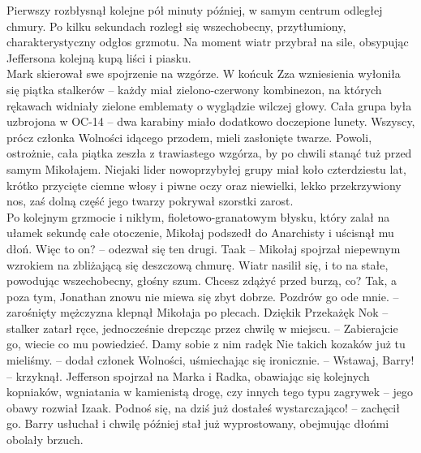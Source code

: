 \documentclass[../MAIN.tex]{subfiles}
\begin{document}
Pierwszy rozbłysnął kolejne pół minuty później, w samym centrum odległej chmury. Po kilku sekundach rozległ się wszechobecny, przytłumiony, charakterystyczny odgłos grzmotu. Na moment wiatr przybrał na sile, obsypując Jeffersona kolejną kupą liści i piasku.\\
Mark skierował swe spojrzenie na wzgórze.
\sx W końcu\3k \qd
Zza wzniesienia wyłoniła się piątka stalkerów -- każdy miał zielono-czerwony kombinezon, na których rękawach widniały zielone emblematy o wyglądzie wilczej głowy. Cała grupa była uzbrojona w OC-14 -- dwa karabiny miało dodatkowo doczepione lunety. Wszyscy, prócz członka Wolności idącego przodem, mieli zasłonięte twarze. Powoli, ostrożnie, cała piątka zeszła z trawiastego wzgórza, by po chwili stanąć tuż przed samym Mikołajem. Niejaki lider nowoprzybyłej grupy miał koło czterdziestu lat, krótko przycięte ciemne włosy i piwne oczy oraz niewielki, lekko przekrzywiony nos, zaś dolną część jego twarzy pokrywał szorstki zarost.\\
Po kolejnym grzmocie i nikłym, fioletowo-granatowym błysku, który zalał na ułamek sekundę całe otoczenie, Mikołaj podszedł do Anarchisty i uścisnął mu dłoń.
\sx Więc to on? -- odezwał się ten drugi.
\xx Taa\3k -- Mikołaj spojrzał niepewnym wzrokiem na zbliżającą się deszczową chmurę. 
\qd
Wiatr nasilił się, i to na stałe, powodując wszechobecny, głośny szum.
\sx Chcesz zdążyć przed burzą, co?
\xx Tak, a poza tym, Jonathan znowu nie miewa się zbyt dobrze.
\xx Pozdrów go ode mnie. -- zarośnięty mężczyzna klepnął Mikołaja po plecach.
\xx Dzięki\3k Przekażę\3k No\3k -- stalker zatarł ręce, jednocześnie drepcząc przez chwilę w miejscu. -- Zabierajcie go, wiecie co mu powiedzieć.
\xx Damy sobie z nim radę\3k Nie takich kozaków już tu mieliśmy. -- dodał członek Wolności, uśmiechając się ironicznie. -- Wstawaj, Barry! -- krzyknął.
\qd
Jefferson spojrzał na Marka i Radka, obawiając się kolejnych kopniaków, wgniatania w kamienistą drogę, czy innych tego typu zagrywek -- jego obawy rozwiał Izaak.
\sx Podnoś się, na dziś już dostałeś wystarczająco! -- zachęcił go. \qd
Barry usłuchał i chwilę później stał już wyprostowany, obejmując dłońmi obolały brzuch.
\end{document}
